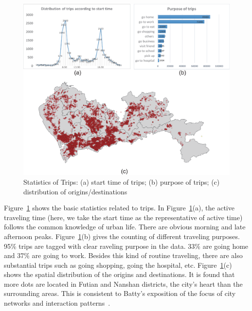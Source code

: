 \begin{figure}[htb!]
 \centering %
 \includegraphics[width=\columnwidth]{pictures/data3}
 \caption{Statistics of Trips: (a) start time of trips; (b) purpose of trips; (c) distribution of origins/destinations }
 \label{fig:data_geometry}
\end{figure}

Figure~\ref{fig:data_geometry} shows the basic statistics related to trips. In Figure~\ref{fig:data_geometry}(a), the active traveling time (here, we take the start time as the representative of active time) follows the common knowledge of urban life. There are obvious morning and late afternoon peaks. Figure~\ref{fig:data_geometry}(b) gives the counting of different traveling purposes. 95\% trips are tagged with clear raveling purpose in the data. 33\% are going home and 37\% are going to work. Besides this kind of routine traveling, there are also substantial trips such as going shopping, going the hospital, etc. Figure~\ref{fig:data_geometry}(c) shows the spatial distribution of the origins and destinations. It is found that more dots are located in Futian and Nanshan districts, the city's heart than the surrounding areas. This is consistent to Batty's exposition of the focus of city networks and interaction patterns~\citep{batty2013new}.


